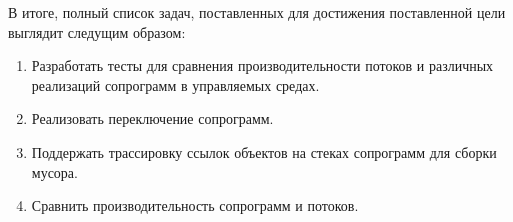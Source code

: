	В итоге, полный список задач, поставленных для достижения поставленной цели выглядит следущим образом:
	\begin{enumerate}
		\item Разработать тесты для сравнения производительности потоков и различных реализаций сопрограмм в управляемых средах. 
		\item Реализовать переключение сопрограмм.
		\item Поддержать трассировку ссылок объектов на стеках сопрограмм для сборки мусора. 
		\item Сравнить производительность сопрограмм и потоков.
	\end{enumerate}
	  
\clearpage